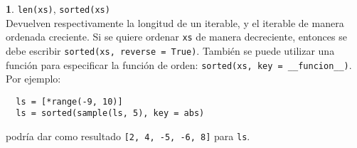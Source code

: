 \documentclass[12pt]{article}
\theoremstyle{definition}
\newtheorem{funcion}{}[section]
\begin{document}
\begin{funcion}
  \verb|len(xs)|, \verb|sorted(xs)| \\[1ex]
  Devuelven respectivamente la longitud de un iterable, y el iterable de manera ordenada creciente. Si se quiere ordenar \verb|xs| de manera decreciente, entonces se debe escribir \verb|sorted(xs, reverse = True)|. También se puede utilizar una función para especificar la función de orden: \newline
  \verb|sorted(xs, key = __funcion__)|. Por ejemplo:
  \begin{verbatim}
  ls = [*range(-9, 10)]
  ls = sorted(sample(ls, 5), key = abs)
  \end{verbatim}
  podría dar como resultado \verb|[2, 4, -5, -6, 8]| para \verb|ls|.
\end{funcion}
\end{document}
